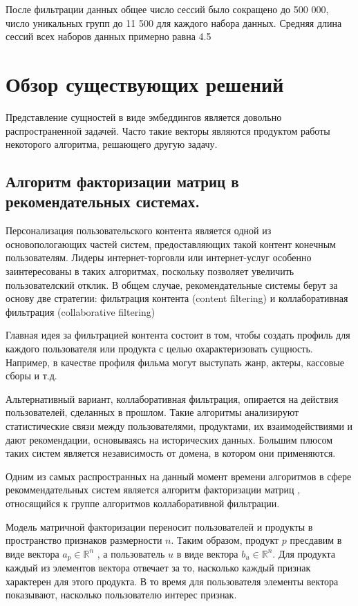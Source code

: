 \documentclass[times,specification,annotation]{itmo-student-thesis}
\begin{document}
После фильтрации данных общее число сессий было сокращено до 500 000, число уникальных групп до 11 500 для каждого набора данных. Средняя длина сессий всех наборов данных примерно равна 4.5

\section{Обзор существующих решений}

Представление сущностей в виде эмбеддингов является довольно распространенной задачей. Часто такие векторы являются продуктом работы некоторого алгоритма, решающего другую задачу. 

\subsection{Алгоритм факторизации матриц в рекомендательных системах.}\label{sec:als}

Персонализация пользовательского контента является одной из основопологающих частей систем, предоставляющих такой контент конечным пользователям. Лидеры интернет-торговли или интернет-услуг особенно заинтересованы в таких алгоритмах, поскольку позволяет увеличить пользователский отклик.
В общем случае, рекомендательные системы берут за основу две стратегии: фильтрация контента (content filtering) и коллаборативная фильтрация (collaborative filtering)
  
Главная идея за фильтрацией контента состоит в том, чтобы создать профиль для каждого пользователя или продукта с целью охарактеризовать сущность. Например, в качестве профиля фильма могут выступать жанр, актеры, кассовые сборы и т.д.

Альтернативный вариант, коллаборативная фильтрация, опирается на действия пользователей, сделанных в прошлом. Такие алгоритмы анализируют статистические связи между пользователями, продуктами, их взаимодействиями и дают рекомендации, основываясь на исторических данных.  Большим плюсом таких систем является независимость от домена, в котором они применяются.

Одним из самых распространных на данный момент времени алгоритмов в сфере рекоммендательных систем является алгоритм факторизации матриц \cite{koren2009}, относящийся к группе алгоритмов коллаборативной фильтрации.

Модель матричной факторизации переносит пользователей и продукты в пространство признаков размерности $n$. Таким образом, продукт $p$ пресдавим в виде вектора $a_{p} \in \mathbb{R}^n$ , а пользователь $u$ в виде вектора $b_{u} \in \mathbb{R}^n$. Для продукта каждый из элементов вектора отвечает за то, насколько каждый признак характерен для  этого продукта. В то время для пользователя элементы вектора показывают, насколько пользователю интерес признак.
\end{document}
